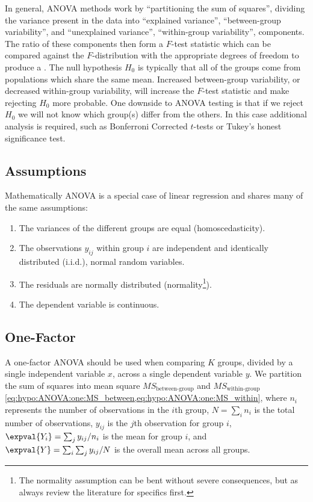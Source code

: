 In general, ANOVA methods work by ``partitioning the sum of squares'',
\ie dividing the variance present in the data into
``explained variance'', \ie ``between-group variability'',
and
``unexplained variance'', \ie ``within-group variability'',
components.
The ratio of these components then form a $F$-test statistic
which can be compared against the $F$-distribution
with the appropriate degrees of freedom to produce a \pvalue.
The null hypothesis $H_{0}$ is typically that all of the groups come from populations which share the same mean.
Increased between-group variability, or decreased within-group variability,
will increase the $F$-test statistic and make rejecting $H_{0}$ more probable.
One downside to ANOVA testing is that if we reject $H_{0}$
we will not know which group(s) differ from the others.
In this case additional \posthoc analysis is required,
such as Bonferroni Corrected $t$-tests or Tukey's honest significance test.

\subsection{Assumptions}
\label{hypo:ANOVA:assumptions}

Mathematically ANOVA is a special case of linear regression
and shares many of the same assumptions:

\begin{enumerate}[noitemsep]
  \item The variances of the different groups are equal (homoscedasticity).
  \item The observations $y_{ij}$ within group $i$ are independent and identically distributed (i.i.d.), normal random variables.
  \item The residuals are normally distributed (normality\footnote{The normality assumption can be bent without severe consequences, but as always review the literature for specifics first.}).
  \item The dependent variable is continuous.
\end{enumerate}

\subsection{One-Factor}
\label{hypo:ANOVA:one}

A one-factor ANOVA should be used when comparing $K$ groups,
divided by a single independent variable $x$,
across a single dependent variable $y$.
We partition the sum of squares into
mean square $MS_{\text{between-group}}$ and $MS_{\text{within-group}}$
\cref{eq:hypo:ANOVA:one:MS_between,eq:hypo:ANOVA:one:MS_within}, where
$n_{i}$ represents the number of observations in the $i$th group,
$N = \sum_{i} n_{i}$ is the total number of observations,
$y_{ij}$ is the $j$th observation for group $i$,
$\expval{Y_{i}} = \sum_{j} y_{ij} / n_{i}$ is the mean for group $i$,
and $\expval{Y} = \sum_{i}\sum_{j} y_{ij} / N$ is the overall mean across all groups.

